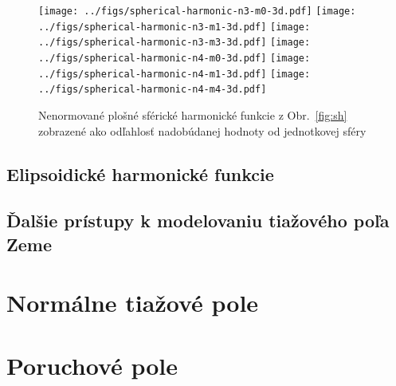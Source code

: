 \documentclass[a4paper, 12pt]{book}
\begin{document}
\begin{figure}[bt]
\centering
\texttt{[image: ../figs/spherical-harmonic-n3-m0-3d.pdf]}
\texttt{[image: ../figs/spherical-harmonic-n3-m1-3d.pdf]}
\texttt{[image: ../figs/spherical-harmonic-n3-m3-3d.pdf]}
\texttt{[image: ../figs/spherical-harmonic-n4-m0-3d.pdf]}
\texttt{[image: ../figs/spherical-harmonic-n4-m1-3d.pdf]}
\texttt{[image: ../figs/spherical-harmonic-n4-m4-3d.pdf]}
\caption{Nenormované plošné sférické harmonické funkcie z Obr.~\ref{fig:sh} 
zobrazené ako odľahlosť nadobúdanej hodnoty od jednotkovej sféry}
\label{fig:sh3d}
\end{figure}






\section{Elipsoidické harmonické funkcie}







\section{Ďalšie prístupy k modelovaniu tiažového poľa Zeme}

\chapter{Normálne tiažové pole}
\label{sec:normal_gravity_field}








\chapter{Poruchové pole}
\label{sec:disturbing_field}
\end{document}
